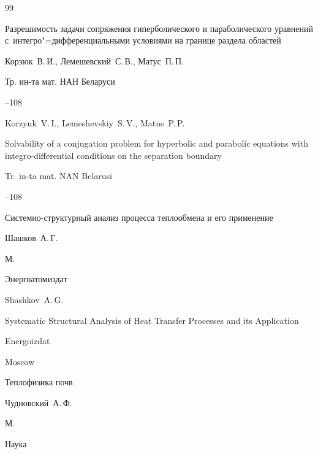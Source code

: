\begin{thebibliography}{99}

\paper Разрешимость задачи сопряжения гиперболического и параболического уравнений с~интегро"=дифференциальными условиями на границе раздела областей

\by Корзюк~В.\,И., Лемешевский~С.\,В., Матус~П.\,П.

\jour Тр. ин-та мат. НАН Беларуси



--108

\misctransl

\by Korzyuk~V.\,I., Lemeshevskiy~S.\,V., Matus~P.\,P.

\paper Solvability of a conjugation problem for hyperbolic and parabolic equations with integro-differential conditions on the separation boundary

\jour Tr. in-ta mat. NAN Belarusi



--108





\book Системно-структурный анализ процесса теплообмена и его применение

\by  Шашков~А.\,Г.

\publaddr М.

\publ Энергоатомиздат



\misctransl

\by Shashkov~A.\,G.

\book Systematic Structural Analysis of Heat Transfer Processes and its Application

\publ Energoizdat

\publaddr Moscow 







\book Теплофизика почв

\by  Чудновский~А.\,Ф.

\publaddr М.

\publ Наука



\end{thebibliography}

